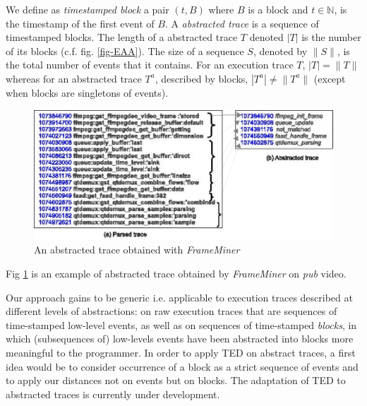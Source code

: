 We define as \textit{timestamped block} a pair $(t,B)$ where $B$ is a block and $t \in \mathbb{N}$,  is the timestamp of the first event of $B$. 
A \textit{abstracted trace} is a sequence of timestamped blocks.
The length of a abstracted trace $T$ denoted $|T|$ is the number of its blocks (c.f. fig. \ref{fig-EAA}). 
 The size of a sequence $S$, denoted by $\|S\|$, is the total number of events that it contains. For an execution trace $T$, $|T|=\|T\|$ whereas for an abstracted trace $T^a$, described by blocks,  $|T^a| \neq \|T^a\|$ (except when blocks are singletons of events).

\begin{figure}[h!pbt]
\centering
 \includegraphics[scale=0.63]{chap4/images/expe_trace2-eps-converted-to.pdf}
\caption{An abstracted trace obtained with {\em FrameMiner}}
\label{fig-abs}
\end{figure}
 Fig \ref{fig-abs} is an example of abstracted trace obtained by {\em FrameMiner} \cite{ck2013} on \textit{pub} video.

Our approach gains to be generic i.e. applicable to execution traces described at different levels of abstractions: on raw execution traces that are sequences of time-stamped low-level events, as well as on sequences of time-stamped \emph{blocks}, in which (subsequences of) low-levels  events have been abstracted into blocks \cite{ck2013}
 more meaningful to the programmer. In order to apply TED on abstract traces, a first idea would be to consider occurrence of a block as a strict sequence of events and to apply our distances not on events but on blocks. The adaptation of TED to abstracted traces is currently under development.\\




